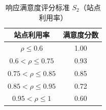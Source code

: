 \begin{table}[h]
\centering
\caption{响应满意度评分标准 $S_2$（站点利用率）}
\begin{tabular}{|c|c|}
\hline
站点利用率 & 满意度分数 \\
\hline
$\rho \leq 0.6$ & 1.00 \\
$0.6 < \rho \leq 0.75$ & 0.93 \\
$0.75 < \rho \leq 0.85$ & 0.85 \\
$0.85 < \rho \leq 0.95$ & 0.72 \\
$0.95 < \rho \leq 1$ & 0.60 \\
\hline
\end{tabular}
\end{table}